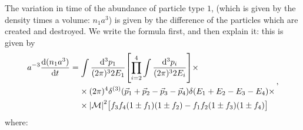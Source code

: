 \documentclass[main.tex]{subfiles}
\begin{document}
The variation in time of the abundance of particle type \(1\), (which is given by the density times a volume: \(n_1 a^3\)) is given by the difference of the particles which are created and destroyed.
We write the formula first, and then explain it: this is given by
%
\begin{subequations}
\begin{align}
\begin{split}
a^{-3} \dv{(n_1 a^3)}{t}
&= \int \frac{ \dd[3]{p_{1}} }{(2 \pi )^3 2 E_1} \qty[\prod_{i=2}^{4}
\int \frac{ \dd[3]{p_{i}} }{(2 \pi )^3 2 E_i}] \times \\
&\phantom{=}\ 
\times (2 \pi )^{4} \delta^{(3)} (\vec{p}_{1} + \vec{p}_{2} - \vec{p}_{3} - \vec{p}_{4})
\delta (E_1 + E_2 - E_3 - E_4 )  \times \\
&\phantom{=}\ 
\times 
\abs{\mathcal{M}}^2
\qty[f_3 f_4 \qty(1 \pm f_1 ) \qty(1 \pm f_2 ) - f_1 f_2 \qty(1 \pm f_3 ) \qty(1 \pm f_4 )]
\end{split}
\,,
\end{align}
\end{subequations}
%
where:
\end{document}
